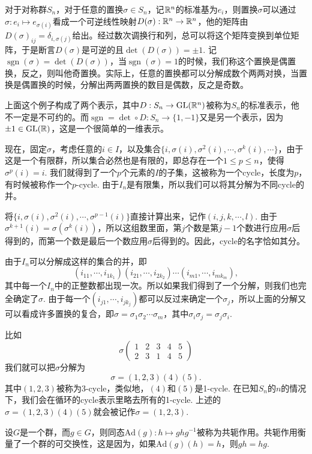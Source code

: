 \documentclass[9pt]{extarticle}
\DeclareMathOperator{\sgn}{sgn}
\begin{document}
\para 对于对称群$S_n$，对于任意的置换$\sigma\in S_n$，记$\mathbb{R}^n$的标准基为$e_i$，则置换$\sigma$可以通过$\sigma:e_i\mapsto e_{\sigma(i)}$看成一个可逆线性映射$D(\sigma): \mathbb{R}^n\to \mathbb{R}^n$，他的矩阵由$D(\sigma)_{ij}=\delta_{i,\sigma(j)}$给出。经过数次调换行和列，总可以将这个矩阵变换到单位矩阵，于是断言$D(\sigma)$是可逆的且$\det(D(\sigma))=\pm 1$. 记$\sgn(\sigma)=\det(D(\sigma))$，当$\sgn(\sigma)=1$的时候，我们称这个置换是偶置换，反之，则叫他奇置换。实际上，任意的置换都可以分解成数个两两对换，当置换是偶置换的时候，分解出两两置换的数目是偶数，反之是奇数。

上面这个例子构成了两个表示，其中$D:S_n\to \mathrm{GL}(\mathbb{R}^n)$被称为$S_n$的标准表示，他不一定是不可约的。而$\sgn=\det\circ D:S_n\to \{1,-1\}$又是另一个表示，因为$\pm 1\in \mathrm{GL}(\mathbb{R})$，这是一个很简单的一维表示。

\para 现在，固定$\sigma$，考虑任意的$i\in I$，以及集合$\{i,\sigma(i),\sigma^2(i),\cdots,\sigma^k(i),\cdots\}$，由于这是一个有限群，所以集合必然也是有限的，即总存在一个$1\leq p\leq n$，使得$\sigma^p(i)=i$. 我们就得到了一个$p$个元素的$I$的子集，这被称为一个cycle，长度为$p$，有时候被称作一个$p$-cycle. 由于$I_n$是有限集，所以我们可以将其分解为不同cycle的并。

将$\{i,\sigma(i),\sigma^2(i),\cdots,\sigma^{p-1}(i)\}$直接计算出来，记作$(i,j,k,\cdots,l)$. 由于$\sigma^{k+1}(i)=\sigma(\sigma^k(i))$，所以这组数里面，第$j$个数是第$j-1$个数进行应用$\sigma$后得到的，而第一个数是最后一个数应用$\sigma$后得到的。因此，cycle的名字恰如其分。

由于$I_n$可以分解成这样的集合的并，即
\[
	(i_{11},\cdots,i_{1k_1})(i_{21},\cdots,i_{2k_2})\cdots (i_{m1},\cdots,i_{mk_m}),
\]
其中每一个$I_n$中的正整数都出现一次。所以如果我们得到了一个分解，则我们也完全确定了$\sigma$. 由于每一个$(i_{j1},\cdots,i_{jk_j})$都可以反过来确定一个$\sigma_j$，所以上面的分解又可以看成许多置换的复合，即$\sigma=\sigma_1 \sigma_2\cdots \sigma_m$，其中$\sigma_i\sigma_j=\sigma_j\sigma_i$.

比如
\[
	\sigma\begin{pmatrix}
	1&2&3&4&5\\
	2&3&1&4&5
	\end{pmatrix}
\]
我们就可以把$\sigma$分解为
\[
	\sigma=(1,2,3)(4)(5).
\]
其中$(1,2,3)$被称为3-cycle，类似地，$(4)$和$(5)$是1-cycle. 在已知$S_n$的$n$的情况下，我们会在循环的cycle表示里略去所有的1-cycle. 上述的$\sigma=(1,2,3)(4)(5)$就会被记作$\sigma=(1,2,3)$.

\para 设$G$是一个群，而$g\in G$，则同态$\mathrm{Ad}(g):h\mapsto ghg^{-1}$被称为共轭作用。共轭作用衡量了一个群的可交换性，这是因为，如果$\mathrm{Ad}(g)(h)=h$，则$gh=hg$.
\end{document}
